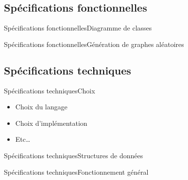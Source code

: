 \subsection{Spécifications fonctionnelles}
\begin{frame}{Spécifications fonctionnelles}{Diagramme de classes}
\end{frame}

\begin{frame}{Spécifications fonctionnelles}{Génération de graphes aléatoires}
\end{frame}

\subsection{Spécifications techniques}
\begin{frame}{Spécifications techniques}{Choix}
\begin{itemize}
\item Choix du langage
\item Choix d'implémentation
\item Etc\ldots
\end{itemize}
\end{frame}


\begin{frame}{Spécifications techniques}{Structures de données}
\end{frame}

\begin{frame}{Spécifications techniques}{Fonctionnement général}
\end{frame}